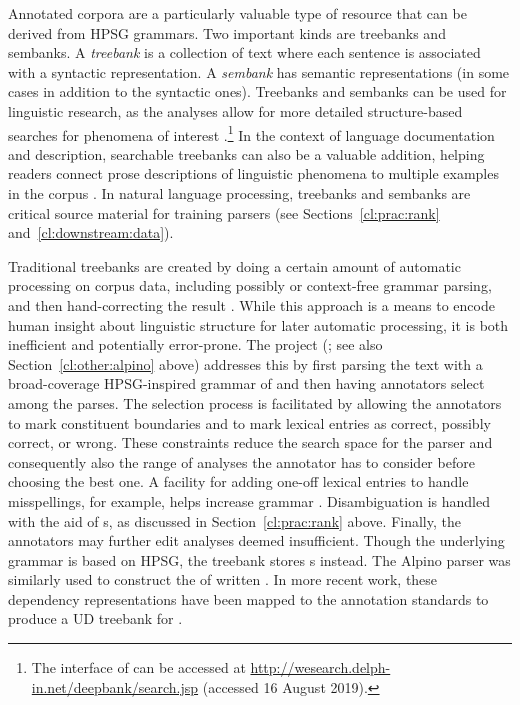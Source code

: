 \documentclass[output=paper
	        ,collection
	        ,collectionchapter
 	        ,biblatex
                ,babelshorthands
                ,newtxmath
                ,draftmode
                ,colorlinks, citecolor=brown
]{langscibook}
\begin{document}
Annotated corpora are a particularly valuable
type of resource that can be derived from HPSG grammars.
Two important kinds are treebanks and sembanks.
A \textit{treebank} is a collection of text
where each sentence is associated with a syntactic representation.
A \textit{sembank} has semantic representations (in some cases
in addition to the syntactic ones). Treebanks and sembanks can be used
for linguistic research, as the analyses allow for more detailed
structure-based searches for phenomena of interest \citep{Rohde:05,Gho:Bir:10,Kou:Oep:14}.\footnote{The  interface of \citet{Kou:Oep:14} can be accessed at \url{http://wesearch.delph-in.net/deepbank/search.jsp} (accessed 16 August 2019).}
In the context of language documentation and description, searchable
treebanks can also be a valuable addition, helping readers connect
prose descriptions of linguistic phenomena to multiple examples in the
corpus \citep{Ben:Gho:Bal:Dri:12}. In natural language processing,
treebanks and sembanks are critical source material for training parsers (see Sections~\ref{cl:prac:rank} and~\ref{cl:downstream:data}).

Traditional treebanks are created by doing a certain amount of
automatic processing on corpus data,
including possibly  or context-free grammar parsing, and
then hand-correcting the result \citep{Mar:San:Mar:93,Ban:Bon:Cai:13}.
While this approach is a means to encode human insight about
linguistic structure for later automatic processing, it is both
inefficient and potentially error-prone. The  project
(\citealt{vanderbeek2002alpino}; see also Section~\ref{cl:other:alpino} above) addresses this by first parsing the text
with a broad-coverage HPSG-inspired grammar of  and then having
annotators select among the parses.
The selection process is facilitated by allowing the annotators
to mark constituent boundaries
and to mark lexical entries as correct, possibly correct, or wrong.
These constraints reduce the search space for the parser and consequently
also the range of analyses the annotator has to consider before
choosing the best one. A facility for adding one-off lexical entries to handle
misspellings, for example, helps increase grammar .  Disambiguation is
handled with the aid of s, as discussed in Section~\ref{cl:prac:rank} above. Finally,
the annotators may further edit analyses deemed insufficient. Though
the underlying grammar is based on HPSG, the treebank stores
s instead.  The Alpino parser was similarly
used to construct the  of written 
\citep{van:bou:van:13}.  In more recent work, these dependency
representations have been mapped to the 
annotation standards \citep{Niv:Mar:Gin:16} to produce a UD treebank
for  \citep{Bou:Van:17}.
\end{document}
